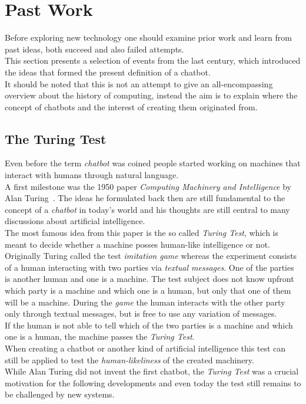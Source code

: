 \section{Past Work}


Before exploring new technology one should examine prior work and learn from past ideas, both succeed and also failed attempts.
\\
This section presents a selection of events from the last century, which introduced the ideas that formed the present definition of a chatbot.
\\
It should be noted that this is not an attempt to give an all-encompassing overview about the history of computing,
instead the aim is to explain where the concept of chatbots and the interest of creating them originated from.


\subsection{The Turing Test}

Even before the term \emph{chatbot} was coined people started working on machines that interact with humans through natural language.
\\
A first milestone was the 1950 paper \emph{Computing Machinery and Intelligence} by Alan Turing~\cite{turing}.
The ideas he formulated back then are still fundamental to the concept of a \emph{chatbot} in today's world
and his thoughts are still central to many discussions about artificial intelligence.
\\
The most famous idea from this paper is the so called \emph{Turing Test},
which is meant to decide whether a machine posses human-like intelligence or not.
\\
Originally Turing called the test \emph{imitation game} whereas the experiment consists of a human interacting with two parties via \emph{textual messages}.
One of the parties is another human and one is a machine.
The test subject does not know upfront which party is a machine and which one is a human, but only that one of them will be a machine.
During the \emph{game} the human interacts with the other party
only through textual messages,
but is free to use any variation of messages.
\\
If the human is not able to tell which of the two parties is a machine and which one is a human, the machine passes the \emph{Turing Test}.
\\

When creating a chatbot or another kind of artificial intelligence this test can still be applied to test the \emph{human-likeliness} of the created machinery.
\\
While Alan Turing did not invent the first chatbot, the \emph{Turing Test} was a crucial motivation for the following developments
and even today the test still remains to be challenged by new systems.


